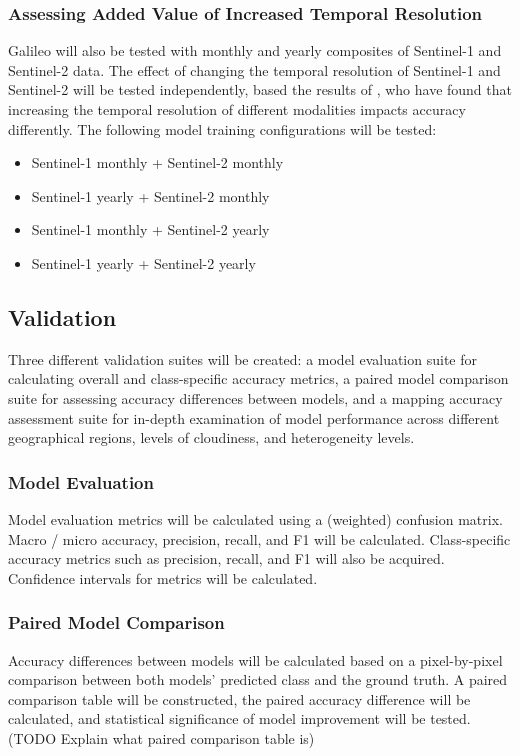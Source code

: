 \documentclass[a4paper,12pt]{article}
\begin{document}
\subsubsection{Assessing Added Value of Increased Temporal Resolution}
Galileo will also be tested with monthly and yearly composites of Sentinel-1 and Sentinel-2 data. The effect of changing the temporal resolution of Sentinel-1 and Sentinel-2 will be tested independently, based the results of \citet{lopesImprovingAccuracyLand2020},  who have found that increasing the temporal resolution of different modalities impacts accuracy differently. The following model training configurations will be tested:
\begin{itemize}
  \item Sentinel-1 monthly + Sentinel-2 monthly
  \item Sentinel-1 yearly + Sentinel-2 monthly
  \item Sentinel-1 monthly + Sentinel-2 yearly
  \item Sentinel-1 yearly + Sentinel-2 yearly
\end{itemize}

\subsection{Validation}
Three different validation suites will be created: a model evaluation suite for calculating overall and class-specific accuracy metrics, a paired model comparison suite for assessing accuracy differences between models, and a mapping accuracy assessment suite for in-depth examination of model performance across different geographical regions, levels of cloudiness, and heterogeneity levels.

\subsubsection{Model Evaluation}
\label{sec:model-evaluation}
Model evaluation metrics will be calculated using a (weighted) confusion matrix. Macro / micro accuracy, precision, recall, and F1 will be calculated. Class-specific accuracy metrics such as precision, recall, and F1 will also be acquired. Confidence intervals for metrics will be calculated.

\subsubsection{Paired Model Comparison}
\label{sec:paired-model-comparison}
Accuracy differences between models will be calculated based on a pixel-by-pixel comparison between both models' predicted class and the ground truth. A paired comparison table will be constructed, the paired accuracy difference will be calculated, and statistical significance of model improvement will be tested. (TODO Explain what paired comparison table is)
\end{document}
